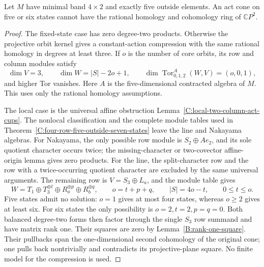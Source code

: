 \begin{lemma}
\label{C:rational-four-row-five-outside-six-states}
Let $M$ have minimal band $4\times2$ and exactly five outside
elements. An act cone on five or six states cannot have the rational
homology and cohomology ring of $\mathbb CP^2$.
\end{lemma}
\begin{proof}
The fixed-state case has zero degree-two products. Otherwise the
projective orbit kernel gives a constant-action compression with the
same rational homology in degrees at least three. If $o$ is the
number of core orbits, its row and column modules satisfy
\[
 \dim V=3,\qquad \dim W=|S|-2o+1,
 \qquad \dim\operatorname{Tor}_{0,1,2}^A(W,V)=(o,0,1),
\]
and higher Tor vanishes. Here $A$ is the five-dimensional contracted
algebra of $M$. This uses only the rational homology assumptions.

The local case is the universal affine obstruction
Lemma~\ref{C:local-two-column-act-cups}. The nonlocal classification
and the complete module tables used in
Theorem~\ref{C:four-row-five-outside-seven-states} leave the line
and Nakayama algebras. For Nakayama, the only possible row module
is $S_2\oplus Ae_2$, and its sole quotient character occurs twice;
the missing-character or two-covector affine-origin lemma gives zero
products. For the line, the split-character row and the row with a
twice-occurring quotient character are excluded by the same universal
arguments. The remaining row is $V=S_3\oplus L_a$, and the module
table gives
\[
 W=T_1\oplus T_3^{\oplus t}\oplus R_a^{\oplus p}
                         \oplus R_b^{\oplus q},\qquad
 o=t+p+q,\qquad |S|=4o-t,
 \qquad 0\leq t\leq o.
\]
Five states admit no solution: $o=1$ gives at most four states,
whereas $o\geq2$ gives at least six. For six states the only
possibility is $o=2,t=2,p=q=0$. Both balanced degree-two forms
then factor through the single $S_3$ row summand and have matrix
rank one. Their squares are zero by Lemma~\ref{B:rank-one-square}.
Their pullbacks span the one-dimensional second cohomology of the
original cone; one pulls back nontrivially and contradicts its
projective-plane square. No finite model for the compression is used.
\end{proof}

